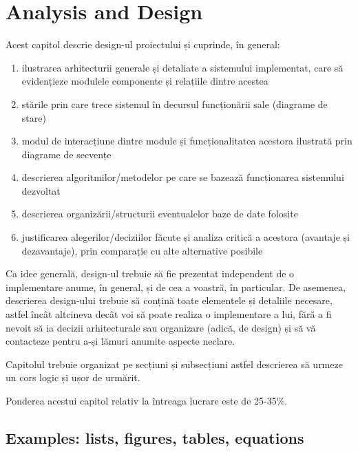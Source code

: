 \chapter{Analysis and Design}
\label{cap:analiza-si-proiectare}

Acest capitol descrie design-ul proiectului și cuprinde, în general: 
\begin{enumerate}
  \item ilustrarea arhitecturii generale și detaliate a sistemului implementat, care să evidențieze modulele componente și relațiile dintre acestea
  \item stările prin care trece sistemul în decursul funcționării sale (diagrame de stare)
  \item modul de interacțiune dintre module și funcționalitatea acestora ilustrată prin diagrame de secvențe
  \item descrierea algoritmilor/metodelor pe care se bazează funcționarea sistemului dezvoltat
  \item descrierea organizării/structurii eventualelor baze de date folosite
  \item justificarea alegerilor/deciziilor făcute și analiza critică a acestora (avantaje și dezavantaje), prin comparație cu alte alternative posibile
\end{enumerate}

Ca idee generală, design-ul trebuie să fie prezentat independent de o implementare anume, în general, și de cea a voastră, în particular. De asemenea, descrierea design-ului trebuie să conțină toate elementele și detaliile necesare, astfel încât altcineva decât voi să poate realiza o implementare a lui, fără a fi nevoit să ia decizii arhitecturale sau organizare (adică, de design) și să vă contacteze pentru a-și lămuri anumite aspecte neclare.

Capitolul trebuie organizat pe secțiuni și subsecțiuni astfel descrierea să urmeze un cors logic și ușor de urmărit. 

Ponderea acestui capitol relativ la întreaga lucrare este de 25-35\%.


\section{Examples: lists, figures, tables, equations}

